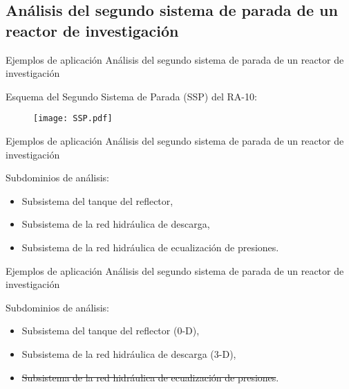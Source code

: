 \subsection{Análisis del segundo sistema de parada de un reactor de investigación}

\begin{frame}
{Ejemplos de aplicación}
{Análisis del segundo sistema de parada de un reactor de investigación}

Esquema del Segundo Sistema de Parada (SSP) del RA-10:

\begin{figure}
\centering{}
\texttt{[image: SSP.pdf]}
\end{figure}

\end{frame}

\begin{frame}
{Ejemplos de aplicación}
{Análisis del segundo sistema de parada de un reactor de investigación}

Subdominios de análisis:

\begin{itemize}
\item <2-> Subsistema del tanque del reflector,
\item <3-> Subsistema de la red hidráulica de descarga,
\item <4-> Subsistema de la red hidráulica de ecualización de presiones.
\end{itemize}

\end{frame}

\begin{frame}
{Ejemplos de aplicación}
{Análisis del segundo sistema de parada de un reactor de investigación}

Subdominios de análisis:

\begin{itemize}
\item Subsistema del tanque del reflector (0-D),
\item Subsistema de la red hidráulica de descarga (3-D),
\item \sout{Subsistema de la red hidráulica de ecualización de presiones}.
\end{itemize}

\end{frame}


